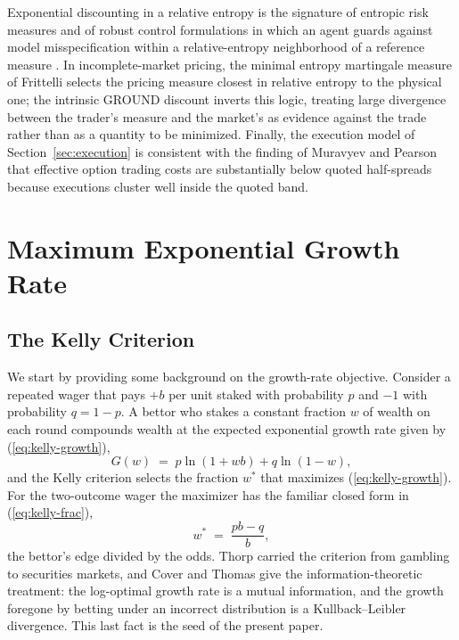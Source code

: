 \documentclass[11pt]{article}
\begin{document}
Exponential discounting in a relative entropy is the signature of entropic
risk measures \cite{follmer2002} and of robust control formulations in which
an agent guards against model misspecification within a relative-entropy
neighborhood of a reference measure \cite{hansensargent2008,
maccheroni2006}. In incomplete-market pricing, the minimal entropy martingale
measure of Frittelli \cite{frittelli2000} selects the pricing measure closest
in relative entropy to the physical one; the intrinsic GROUND discount inverts
this logic, treating large divergence between the trader's measure and the
market's as evidence against the trade rather than as a quantity to be
minimized. Finally, the execution model of Section~\ref{sec:execution} is
consistent with the finding of Muravyev and Pearson \cite{muravyev2020} that
effective option trading costs are substantially below quoted half-spreads
because executions cluster well inside the quoted band.

\section{Maximum Exponential Growth Rate}
\label{sec:growthrate}

\subsection{The Kelly Criterion}

We start by providing some background on the growth-rate objective. Consider
a repeated wager that pays $+b$ per unit staked with probability $p$ and
$-1$ with probability $q = 1 - p$. A bettor who stakes a constant fraction
$w$ of wealth on each round compounds wealth at the expected exponential
growth rate given by (\ref{eq:kelly-growth}),
\begin{equation}
G(w) \;=\; p \ln(1 + wb) + q \ln(1 - w),
\label{eq:kelly-growth}
\end{equation}
and the Kelly criterion \cite{kelly1956} selects the fraction $w^\ast$ that
maximizes (\ref{eq:kelly-growth}). For the two-outcome wager the maximizer
has the familiar closed form in (\ref{eq:kelly-frac}),
\begin{equation}
w^\ast \;=\; \frac{pb - q}{b},
\label{eq:kelly-frac}
\end{equation}
the bettor's edge divided by the odds. Thorp \cite{thorp1971} carried the
criterion from gambling to securities markets, and Cover and Thomas
\cite{coverthomas2006} give the information-theoretic treatment: the
log-optimal growth rate is a mutual information, and the growth foregone by
betting under an incorrect distribution is a Kullback--Leibler divergence.
This last fact is the seed of the present paper.
\end{document}
